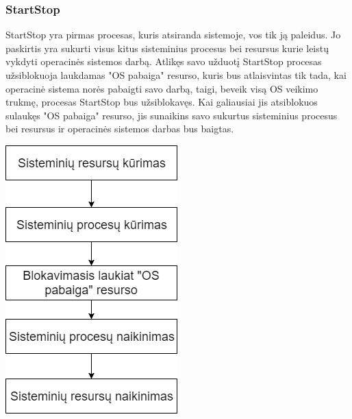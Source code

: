 \documentclass{scrartcl}
\begin{document}
        \subsubsection{StartStop}
          StartStop yra pirmas procesas, kuris atsiranda sistemoje, vos tik ją paleidus. Jo paskirtis yra sukurti visus kitus sisteminius procesus bei resursus kurie leistų vykdyti operacinės sistemos darbą. Atlikęs savo užduotį StartStop procesas užsiblokuoja laukdamas "OS pabaiga" resurso, kuris bus atlaisvintas tik tada, kai operacinė sistema norės pabaigti savo darbą, taigi, beveik visą OS veikimo trukmę, procesas StartStop bus užsiblokavęs. Kai galiausiai jis atsiblokuos sulaukęs "OS pabaiga" resurso, jis sunaikins savo sukurtus sisteminius procesus bei resursus ir operacinės sistemos darbas bus baigtas.
          \begin{center}
            \includegraphics[scale=0.5]{StartStop}
          \end{center}
\end{document}
